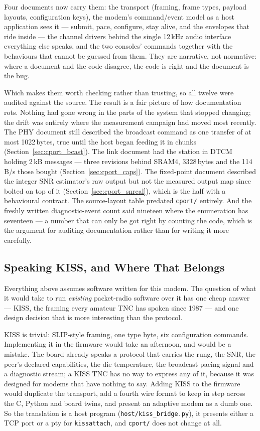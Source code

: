 Four documents now carry them: the transport (framing, frame types,
payload layouts, configuration keys), the modem's command/event model
as a host application sees it --- submit, pace, configure, stay
alive, and the envelopes that ride inside --- the channel drivers
behind the single 12\,kHz audio interface everything else speaks, and
the two consoles' commands together with the behaviours that cannot be
guessed from them.  They are narrative, not normative: where a document
and the code disagree, the code is right and the document is the bug.

Which makes them worth checking rather than trusting, so all twelve
were audited against the source.  The result is a fair picture of how
documentation rots.  Nothing had gone wrong in the parts of the system
that stopped changing; the drift was entirely where the measurement
campaign had moved most recently.  The PHY document still described the
broadcast command as one transfer of at most 1022\,bytes, true until
the host began feeding it in chunks
(Section~\ref{sec:cport_bcast}).  The link document had the station in
DTCM holding 2\,kB messages --- three revisions behind SRAM4,
3328\,bytes and the 114\,B/s those bought
(Section~\ref{sec:cport_caps}).  The fixed-point document described
the integer SNR estimator's raw output but not the measured output map
since bolted on top of it (Section~\ref{sec:cport_snrcal}), which is
the half with a behavioural contract.  The source-layout table predated
\texttt{cport/} entirely.  And the freshly written diagnostic-event
count said nineteen where the enumeration has seventeen --- a number
that can only be got right by counting the code, which is the argument
for auditing documentation rather than for writing it more carefully.

\subsection{Speaking KISS, and Where That Belongs}
\label{sec:cport_kiss}

Everything above assumes software written for this modem.  The question
of what it would take to run \emph{existing} packet-radio software over
it has one cheap answer --- KISS, the framing every amateur TNC has
spoken since 1987 --- and one design decision that is more interesting
than the protocol.

KISS is trivial: SLIP-style framing, one type byte, six configuration
commands.  Implementing it in the firmware would take an afternoon, and
would be a mistake.  The board already speaks a protocol that carries
the rung, the SNR, the peer's declared capabilities, the die
temperature, the broadcast pacing signal and a diagnostic stream; a
KISS TNC has no way to express any of it, because it was designed for
modems that have nothing to say.  Adding KISS to the firmware would
duplicate the transport, add a fourth wire format to keep in step
across the C, Python and board twins, and present an adaptive modem as
a dumb one.  So the translation is a host program
(\texttt{host/kiss\_bridge.py}), it presents either a TCP port or a pty
for \texttt{kissattach}, and \texttt{cport/} does not change at all.


